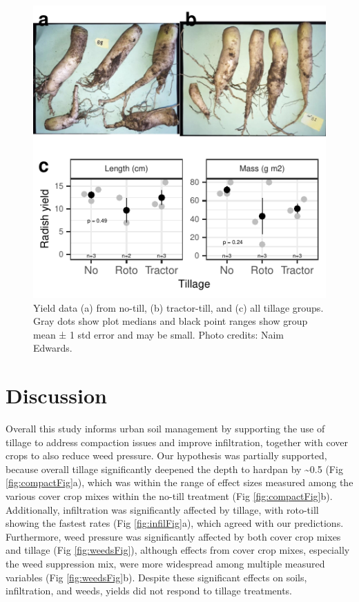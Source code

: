 \documentclass[
  12pt,
]{article}
\begin{document}
\begin{figure}
\centering
\includegraphics{merge_files/figure-latex/yieldFig-1.pdf}
\caption{\label{fig:yieldFig}Yield data (a) from no-till, (b) tractor-till, and (c) all tillage groups. Gray dots show plot medians and black point ranges show group mean ± 1 std error and may be small. Photo credits: Naim Edwards.}
\end{figure}

\hypertarget{discussion}{%
\section{Discussion}\label{discussion}}

Overall this study informs urban soil management by supporting the use of tillage to address compaction issues and improve infiltration, together with cover crops to also reduce weed pressure.
Our hypothesis was partially supported, because overall tillage significantly deepened the depth to hardpan by \textasciitilde0.5 (Fig \ref{fig:compactFig}a), which was within the range of effect sizes measured among the various cover crop mixes within the no-till treatment (Fig \ref{fig:compactFig}b).
Additionally, infiltration was significantly affected by tillage, with roto-till showing the fastest rates (Fig \ref{fig:infilFig}a), which agreed with our predictions.
Furthermore, weed pressure was significantly affected by both cover crop mixes and tillage (Fig \ref{fig:weedsFig}), although effects from cover crop mixes, especially the weed suppression mix, were more widespread among multiple measured variables (Fig \ref{fig:weedsFig}b).
Despite these significant effects on soils, infiltration, and weeds, yields did not respond to tillage treatments.
\end{document}
